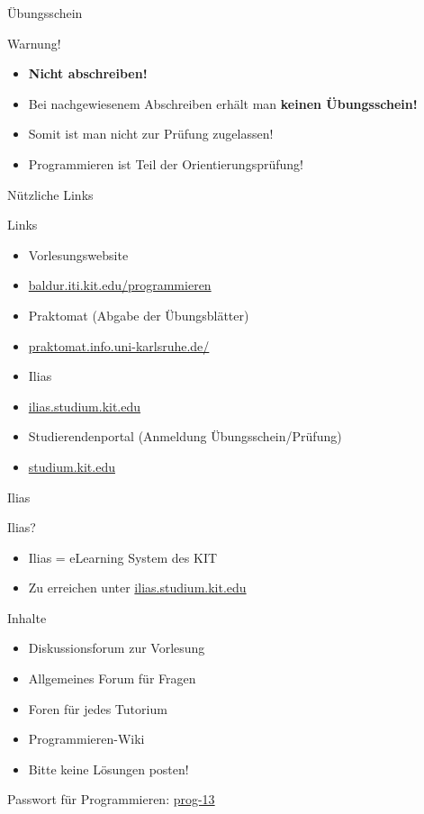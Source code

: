 \documentclass[18pt]{beamer}
\begin{document}
\begin{frame}{Übungsschein}
	\begin{alertblock}{Warnung!}
		\begin{itemize}
			\item \textbf{Nicht abschreiben!}
			\item Bei nachgewiesenem Abschreiben erhält man \textbf{keinen Übungsschein!}
			\item Somit ist man nicht zur Prüfung zugelassen!
			\item Programmieren ist Teil der Orientierungsprüfung!
		\end{itemize}
	\end{alertblock}	
\end{frame}

\begin{frame}{Nützliche Links}
	\begin{block}{Links}
	\begin{itemize}
		\item Vorlesungswebsite
		\item[] \url{baldur.iti.kit.edu/programmieren}
		\item Praktomat (Abgabe der Übungsblätter)
		\item[] \url{praktomat.info.uni-karlsruhe.de/}
		\item Ilias
		\item[] \url{ilias.studium.kit.edu}
		\item Studierendenportal (Anmeldung Übungsschein/Prüfung)
		\item[] \url{studium.kit.edu}
	\end{itemize}
	\end{block}
\end{frame}

\begin{frame}{Ilias}
	\begin{block}{Ilias?}
	\begin{itemize}
		\item Ilias = eLearning System des KIT
		\item Zu erreichen unter \url{ilias.studium.kit.edu}
	\end{itemize}
	\end{block}
	\pause
	\begin{block}{Inhalte}
	\begin{itemize}
		\item Diskussionsforum zur Vorlesung
		\item Allgemeines Forum für Fragen
		\item Foren für jedes Tutorium
		\item Programmieren-Wiki
		\item \textcolor[rgb]{1,0,0}{Bitte keine Lösungen posten!}
	\end{itemize}
	\end{block}
	Passwort für Programmieren: \hspace{1cm} \url{prog-13}
\end{frame}
\end{document}

